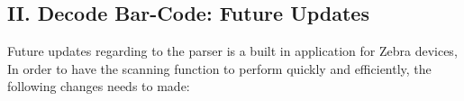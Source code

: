 \documentclass[a4paper]{article}
\begin{document}
\subsection*{II. Decode Bar-Code: Future Updates}
\begin{scriptsize}
	Future updates regarding to the parser is a built in application for Zebra devices, In order to have the scanning function to perform quickly and efficiently, the following changes needs to made:
 
	
\end{scriptsize}
\end{document}
